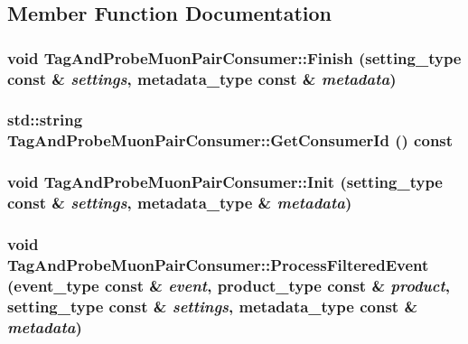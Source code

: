 \subsection{Member Function Documentation}
\hypertarget{classTagAndProbeMuonPairConsumer_abe8dd79c624d280d91bcd872c475a676}{
\subsubsection[{Finish}]{\setlength{\rightskip}{0pt plus 5cm}void TagAndProbeMuonPairConsumer::Finish (setting\_\-type const \& {\em settings}, \/  metadata\_\-type const \& {\em metadata})}}
\label{classTagAndProbeMuonPairConsumer_abe8dd79c624d280d91bcd872c475a676}
\hypertarget{classTagAndProbeMuonPairConsumer_a2280550fe9cb5ca7c9e9309d598fa50f}{
\subsubsection[{GetConsumerId}]{\setlength{\rightskip}{0pt plus 5cm}std::string TagAndProbeMuonPairConsumer::GetConsumerId () const}}
\label{classTagAndProbeMuonPairConsumer_a2280550fe9cb5ca7c9e9309d598fa50f}
\hypertarget{classTagAndProbeMuonPairConsumer_a1d466581f46cd6e9d493f750d97fad7b}{
\subsubsection[{Init}]{\setlength{\rightskip}{0pt plus 5cm}void TagAndProbeMuonPairConsumer::Init (setting\_\-type const \& {\em settings}, \/  metadata\_\-type \& {\em metadata})}}
\label{classTagAndProbeMuonPairConsumer_a1d466581f46cd6e9d493f750d97fad7b}
\hypertarget{classTagAndProbeMuonPairConsumer_a7b9899bcda048210461c98f5d8364b49}{
\subsubsection[{ProcessFilteredEvent}]{\setlength{\rightskip}{0pt plus 5cm}void TagAndProbeMuonPairConsumer::ProcessFilteredEvent (event\_\-type const \& {\em event}, \/  product\_\-type const \& {\em product}, \/  setting\_\-type const \& {\em settings}, \/  metadata\_\-type const \& {\em metadata})}}
